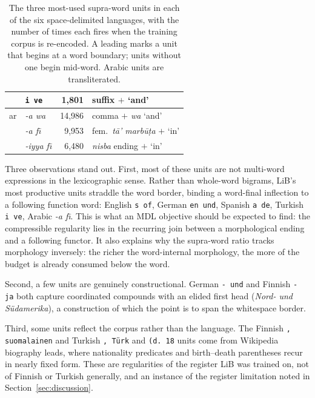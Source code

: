 \documentclass[pdflatex,sn-apa]{sn-jnl}
\begin{document}
\begin{table}[t]
\begin{tabular}{llrl}
   & \texttt{i ve}                     &  1{,}801 & suffix $+$ `and' \\
\midrule
ar & \textit{-a wa}                    & 14{,}986 & comma $+$ \emph{wa} `and' \\
   & \textit{-a f\={\i}}               &  9{,}953 & fem.\ \emph{t\={a}' marb\={u}\d{t}a} $+$ `in' \\
   & \textit{-iyya f\={\i}}            &  6{,}480 & \emph{nisba} ending $+$ `in' \\
\bottomrule
\end{tabular}
\caption{The three most-used supra-word units in each of the six
space-delimited languages, with the number of times each fires when the
training corpus is re-encoded. A leading \texttt{\textvisiblespace} marks a
unit that begins at a word boundary; units without one begin mid-word. Arabic
units are transliterated.}
\label{tab:supra-examples}
\end{table}

Three observations stand out.
First, most of these units are not multi-word expressions in the lexicographic
sense. Rather than whole-word bigrams, LiB's most productive units
straddle the word border, binding a word-final inflection to a
following function word: English \texttt{s of}, German \texttt{en und},
Spanish \texttt{a de}, Turkish \texttt{i ve}, Arabic \emph{-a f\={\i}}. This
is what an MDL objective should be expected to find: the compressible
regularity lies in the recurring join between a morphological ending
and a following functor.
It also explains why the supra-word ratio tracks
morphology inversely: the richer the word-internal morphology, the more of the
budget is already consumed below the word.

Second, a few units are genuinely constructional. German \texttt{- und} and
Finnish \texttt{- ja} both capture coordinated compounds with an elided
first head (\emph{Nord- und Südamerika}), a construction of which the point is
to span the whitespace border.

Third, some units reflect the corpus rather than the language. The Finnish
\texttt{, suomalainen} and Turkish \texttt{, Türk} and
\texttt{\textvisiblespace (d. 18} units come from Wikipedia biography leads,
where nationality predicates and birth--death parentheses recur in nearly
fixed form. These are regularities of the register LiB was trained on,
not of Finnish or Turkish generally, and an instance of the
register limitation noted in Section~\ref{sec:discussion}.

\end{document}
